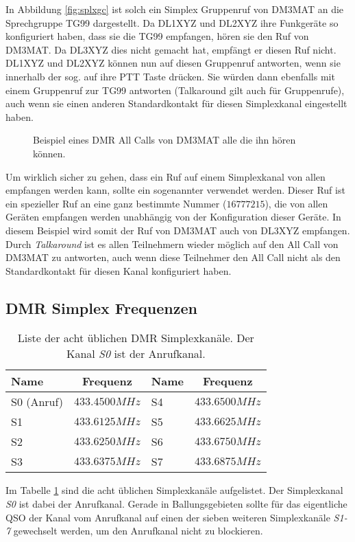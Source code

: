 In Abbildung \ref{fig:splxgc} ist solch ein Simplex Gruppenruf von DM3MAT an die Sprechgruppe TG99 dargestellt. Da DL1XYZ und DL2XYZ ihre Funkgeräte so konfiguriert haben, dass sie die TG99 empfangen, hören sie den Ruf von DM3MAT. Da DL3XYZ dies nicht gemacht hat, empfängt er diesen Ruf nicht. DL1XYZ und DL2XYZ können nun auf diesen Gruppenruf antworten, wenn sie innerhalb der sog.  auf ihre PTT Taste drücken. Sie würden dann ebenfalls mit einem Gruppenruf zur TG99 antworten (Talkaround gilt auch für Gruppenrufe), auch wenn sie einen anderen Standardkontakt für diesen Simplexkanal eingestellt haben.

\begin{figure}[!ht]
  \centering
  
  \caption{Beispiel eines DMR All Calls von DM3MAT alle die ihn hören können.} \label{fig:splxac}
\end{figure}

Um wirklich sicher zu gehen, dass ein Ruf auf einem Simplexkanal von allen empfangen werden kann, sollte ein sogenannter  verwendet werden. Dieser Ruf ist ein spezieller Ruf an eine ganz bestimmte Nummer ($16777215$), die von allen Geräten empfangen werden unabhängig von der Konfiguration dieser Geräte. In diesem Beispiel wird somit der Ruf von DM3MAT auch von DL3XYZ empfangen. Durch \emph{Talkaround} ist es allen Teilnehmern wieder möglich auf den All Call von DM3MAT zu antworten, auch wenn diese Teilnehmer den All Call nicht als den Standardkontakt für diesen Kanal konfiguriert haben. 

\subsection{DMR Simplex Frequenzen}
\begin{table}[!ht]
 \centering
 \begin{tabular}{|l|c||l|c|} \hline
  Name & Frequenz & Name & Frequenz \\ \hline \hline
  S0 (Anruf) & $433.4500 MHz$ & S4 & $433.6500 MHz$ \\
  S1         & $433.6125 MHz$ & S5 & $433.6625 MHz$ \\
  S2         & $433.6250 MHz$ & S6 & $433.6750 MHz$ \\
  S3         & $433.6375 MHz$ & S7 & $433.6875 MHz$ \\ \hline
 \end{tabular}
 \caption{Liste der acht üblichen DMR Simplexkanäle. Der Kanal \emph{S0} ist der Anrufkanal.} \label{tab:simplex}
\end{table}

Im Tabelle \ref{tab:simplex} sind die acht üblichen Simplexkanäle aufgelistet. Der Simplexkanal \emph{S0} ist dabei der Anrufkanal. Gerade in Ballungsgebieten sollte für das eigentliche QSO der Kanal vom Anrufkanal auf einen der sieben weiteren Simplexkanäle \emph{S1-7} gewechselt werden, um den Anrufkanal nicht zu blockieren. 